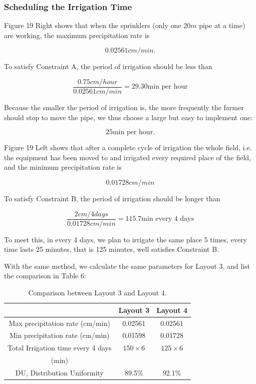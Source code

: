 \documentclass[12pt,a4paper,titlepage]{article}
\begin{document}
\subsubsection{Scheduling the Irrigation Time}

Figure 19 Right shows that when the sprinklers (only one $20m$
pipe at a time) are working, the maximum precipitation rate is

\[
0.02561cm/min.
\]

To satisfy Constraint A, the period of irrigation should be less
than

\[
\frac{0.75cm/hour}{0.02561cm/min}=29.30\textrm{min per hour}
\]

Because the smaller the period of irrigation is, the more
frequently the farmer should stop to move the pipe, we thus choose
a large but easy to implement one:

\[
25 \textrm{min per hour.}
\]

Figure 19 Left shows that after a complete cycle of irrigation the
whole field, i.e. the equipment has been moved to and irrigated
every required place of the field, and the minimum precipitation
rate is

\[
0.01728 cm/min
\]

To satisfy Constraint B, the period of irrigation should be longer
than

\[
\frac{2cm/4days}{0.01728cm/min}=115.7\textrm{min every 4 days}
\]

To meet this, in every 4 days, we plan to irrigate the same place
5 times, every time lasts 25 minutes, that is 125 minutes, well
satisfies Constraint B.

With the same method, we calculate the same parameters for Layout
3, and list the comparison in Table 6:

\begin{table}[!htb]
\centering \caption{Comparison between Layout 3 and Layout 4.}
\begin{tabular}{l|ll}
\hline
\multicolumn{1}{c|}{} & \multicolumn{1}{c}{Layout 3} & \multicolumn{1}{c}{Layout 4} \\
\hline
\multicolumn{1}{c|}{Max precipitation rate (cm/min)} & \multicolumn{1}{c}{0.02561} & \multicolumn{1}{c}{0.02561} \\
\hline
\multicolumn{1}{c|}{Min precipitation rate (cm/min)} & \multicolumn{1}{c}{0.01598} & \multicolumn{1}{c}{0.01728} \\
\multicolumn{1}{c|}{Total Irrigation time every 4 days } & \multicolumn{1}{c}{$150\times6$} & \multicolumn{1}{c}{$125\times6$} \\
\multicolumn{1}{c|}{(min)} & \multicolumn{1}{c}{} & \multicolumn{1}{c}{} \\
\multicolumn{1}{c|}{DU, Distribution Uniformity} & \multicolumn{1}{c}{89.5\%} & \multicolumn{1}{c}{92.1\%} \\
\hline
\end{tabular}
\end{table}
\end{document}
